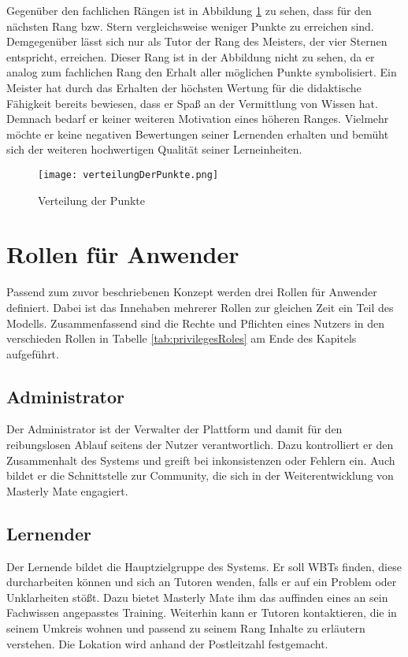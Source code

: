 Gegenüber den fachlichen Rängen ist in Abbildung \ref{ref:vertPunkt} zu sehen,
dass für den nächsten Rang bzw. Stern vergleichsweise weniger Punkte zu
erreichen sind. Demgegenüber lässt sich nur als Tutor der Rang des Meisters, der
vier Sternen entspricht, erreichen. Dieser Rang ist in der Abbildung nicht zu
sehen, da er analog zum fachlichen Rang den Erhalt aller möglichen Punkte
symbolisiert. Ein Meister hat durch das Erhalten der höchsten Wertung für die
didaktische Fähigkeit bereits bewiesen, dass er Spaß an der Vermittlung von
Wissen hat. Demnach bedarf er keiner weiteren Motivation eines höheren Ranges.
Vielmehr möchte er keine negativen Bewertungen seiner Lernenden erhalten und
bemüht sich der weiteren hochwertigen Qualität seiner Lerneinheiten.

\begin{figure}[H]
\texttt{[image: verteilungDerPunkte.png]}
\caption{Verteilung der Punkte}\label{ref:vertPunkt}
\end{figure}

\section{Rollen für Anwender}
Passend zum zuvor beschriebenen Konzept werden drei Rollen für Anwender
definiert. Dabei ist das Innehaben mehrerer Rollen zur gleichen Zeit ein Teil
des Modells. Zusammenfassend sind die Rechte und Pflichten eines Nutzers in den
verschieden Rollen in Tabelle \ref{tab:privilegesRoles} am Ende des
Kapitels aufgeführt.

\subsection{Administrator}
Der Administrator ist der Verwalter der Plattform und damit für den
reibungslosen Ablauf seitens der Nutzer verantwortlich. Dazu kontrolliert er den
Zusammenhalt des Systems und greift bei inkonsistenzen oder Fehlern ein. Auch
bildet er die Schnittstelle zur Community, die sich in der Weiterentwicklung von
Masterly Mate engagiert.

\subsection{Lernender}
Der Lernende bildet die Hauptzielgruppe des Systems. Er soll WBTs finden, diese
durcharbeiten können und sich an Tutoren wenden, falls er auf ein Problem oder
Unklarheiten stößt. Dazu bietet Masterly Mate ihm das auffinden eines an sein
Fachwissen angepasstes Training. Weiterhin kann er Tutoren kontaktieren, die in
seinem Umkreis wohnen und passend zu seinem Rang Inhalte zu erläutern verstehen.
Die Lokation wird anhand der Postleitzahl festgemacht.

